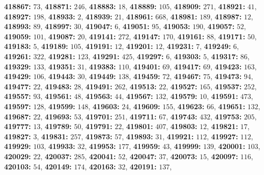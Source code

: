 \textsf{\bfseries 418867:} $73$, \textsf{\bfseries 418871:} $246$, \textsf{\bfseries 418883:} $18$, \textsf{\bfseries 418889:} $105$, \textsf{\bfseries 418909:} $271$, \textsf{\bfseries 418921:} $41$, \textsf{\bfseries 418927:} $198$, \textsf{\bfseries 418933:} $2$, \textsf{\bfseries 418939:} $21$, \textsf{\bfseries 418961:} $668$, \textsf{\bfseries 418981:} $189$, \textsf{\bfseries 418987:} $12$, \textsf{\bfseries 418993:} $89$, \textsf{\bfseries 418997:} $30$, \textsf{\bfseries 419047:} $6$, \textsf{\bfseries 419051:} $95$, \textsf{\bfseries 419053:} $190$, \textsf{\bfseries 419057:} $52$, \textsf{\bfseries 419059:} $101$, \textsf{\bfseries 419087:} $20$, \textsf{\bfseries 419141:} $272$, \textsf{\bfseries 419147:} $170$, \textsf{\bfseries 419161:} $88$, \textsf{\bfseries 419171:} $50$, \textsf{\bfseries 419183:} $5$, \textsf{\bfseries 419189:} $105$, \textsf{\bfseries 419191:} $12$, \textsf{\bfseries 419201:} $12$, \textsf{\bfseries 419231:} $7$, \textsf{\bfseries 419249:} $6$, \textsf{\bfseries 419261:} $322$, \textsf{\bfseries 419281:} $123$, \textsf{\bfseries 419291:} $425$, \textsf{\bfseries 419297:} $6$, \textsf{\bfseries 419303:} $5$, \textsf{\bfseries 419317:} $86$, \textsf{\bfseries 419329:} $133$, \textsf{\bfseries 419351:} $31$, \textsf{\bfseries 419383:} $110$, \textsf{\bfseries 419401:} $69$, \textsf{\bfseries 419417:} $69$, \textsf{\bfseries 419423:} $163$, \textsf{\bfseries 419429:} $106$, \textsf{\bfseries 419443:} $30$, \textsf{\bfseries 419449:} $138$, \textsf{\bfseries 419459:} $72$, \textsf{\bfseries 419467:} $75$, \textsf{\bfseries 419473:} $94$, \textsf{\bfseries 419477:} $22$, \textsf{\bfseries 419483:} $28$, \textsf{\bfseries 419491:} $262$, \textsf{\bfseries 419513:} $22$, \textsf{\bfseries 419527:} $165$, \textsf{\bfseries 419537:} $252$, \textsf{\bfseries 419557:} $93$, \textsf{\bfseries 419561:} $48$, \textsf{\bfseries 419563:} $44$, \textsf{\bfseries 419567:} $132$, \textsf{\bfseries 419579:} $10$, \textsf{\bfseries 419591:} $473$, \textsf{\bfseries 419597:} $128$, \textsf{\bfseries 419599:} $148$, \textsf{\bfseries 419603:} $24$, \textsf{\bfseries 419609:} $155$, \textsf{\bfseries 419623:} $66$, \textsf{\bfseries 419651:} $132$, \textsf{\bfseries 419687:} $22$, \textsf{\bfseries 419693:} $53$, \textsf{\bfseries 419701:} $251$, \textsf{\bfseries 419711:} $67$, \textsf{\bfseries 419743:} $432$, \textsf{\bfseries 419753:} $205$, \textsf{\bfseries 419777:} $13$, \textsf{\bfseries 419789:} $50$, \textsf{\bfseries 419791:} $22$, \textsf{\bfseries 419801:} $407$, \textsf{\bfseries 419803:} $12$, \textsf{\bfseries 419821:} $17$, \textsf{\bfseries 419827:} $3$, \textsf{\bfseries 419831:} $257$, \textsf{\bfseries 419873:} $57$, \textsf{\bfseries 419893:} $31$, \textsf{\bfseries 419921:} $112$, \textsf{\bfseries 419927:} $112$, \textsf{\bfseries 419929:} $103$, \textsf{\bfseries 419933:} $32$, \textsf{\bfseries 419953:} $177$, \textsf{\bfseries 419959:} $43$, \textsf{\bfseries 419999:} $139$, \textsf{\bfseries 420001:} $103$, \textsf{\bfseries 420029:} $22$, \textsf{\bfseries 420037:} $285$, \textsf{\bfseries 420041:} $52$, \textsf{\bfseries 420047:} $37$, \textsf{\bfseries 420073:} $15$, \textsf{\bfseries 420097:} $116$, \textsf{\bfseries 420103:} $54$, \textsf{\bfseries 420149:} $174$, \textsf{\bfseries 420163:} $32$, \textsf{\bfseries 420191:} $137$, 
